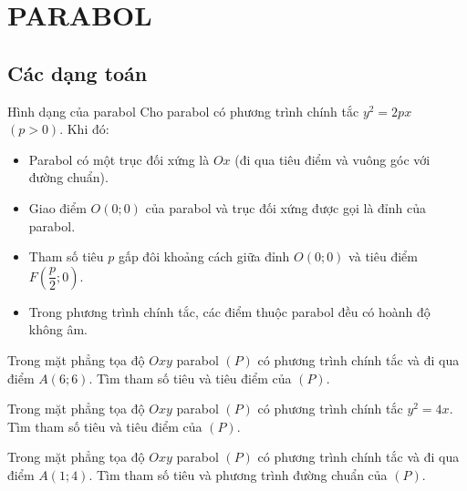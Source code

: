 \section{PARABOL}
\subsection{Các dạng toán}
\begin{dang}{Hình dạng của parabol}
	Cho parabol có phương trình chính tắc $y^2=2px$ $(p>0)$. Khi đó:
	\begin{itemize}
		\item Parabol có một trục đối xứng là $Ox$ (đi qua tiêu điểm và vuông góc với đường chuẩn).
		\item Giao điểm $O(0;0)$ của parabol và trục đối xứng được gọi là đỉnh của parabol.
		\item Tham số tiêu $p$ gấp đôi khoảng cách giữa đỉnh $O(0;0)$ và tiêu điểm $F\left(\dfrac{p}{2};0\right)$.
		\item Trong phương trình chính tắc, các điểm thuộc parabol đều có hoành độ không âm.
	\end{itemize}
\end{dang}
\begin{vd}
	Trong mặt phẳng tọa độ $Oxy$ parabol $(P)$ có phương trình chính tắc và đi qua điểm $A(6;6)$. Tìm tham số tiêu và tiêu điểm của $(P)$.
\end{vd}
\begin{vd}
	Trong mặt phẳng tọa độ $Oxy$ parabol $(P)$ có phương trình chính tắc $y^2=4x$. Tìm tham số tiêu và tiêu điểm của $(P)$.
\end{vd}
\begin{vd}
	Trong mặt phẳng tọa độ $Oxy$ parabol $(P)$ có phương trình chính tắc và đi qua điểm $A(1;4)$. Tìm tham số tiêu và phương trình đường chuẩn của $(P)$.
\end{vd}
